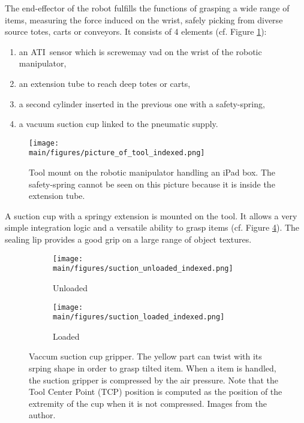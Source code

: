 \documentclass[/home/francois/latex/report/main.tex]{subfiles}
\begin{document}
The end-effector of the robot fulfills the functions of grasping a wide range of items, measuring the force induced on the wrist, safely picking from diverse source totes, carts or conveyors. It consists of 4 elements (cf. Figure \ref{fig:background:tool}):

\begin{enumerate}
  \item an ATI\texttrademark \ sensor which is screwemay vad on the wrist of the robotic manipulator,
  \item an extension tube to reach deep totes or carts,
  \item a second cylinder inserted in the previous one with a safety-spring,
  \item a vacuum suction cup linked to the pneumatic supply.
\end{enumerate}

\begin{figure}[h]
  \centering
  \texttt{[image: \\main/figures/picture\_of\_tool\_indexed.png]}
  \caption{Tool mount on the robotic manipulator handling an iPad box. The safety-spring cannot be seen on this picture because it is inside the extension tube.}
  \label{fig:background:tool}
\end{figure}

A suction cup with a springy extension is mounted on the tool. It allows a very simple integration logic and a versatile ability to grasp items (cf. Figure \ref{fig:background:suction}). The sealing lip provides a good grip on a large range of object textures.

\begin{figure}[h]
\centering
\begin{subfigure}{0.49\textwidth}
\centering
\texttt{[image: \\main/figures/suction\_unloaded\_indexed.png]}
\caption{Unloaded}
\label{fig:background:suction-unloaded}
\end{subfigure}
\begin{subfigure}{0.49\textwidth}
\centering
\texttt{[image: \\main/figures/suction\_loaded\_indexed.png]}
\caption{Loaded}
\label{fig:background:suction-loaded}
\end{subfigure}
\caption{Vaccum suction cup gripper. The yellow part can twist with its srping shape in order to grasp tilted item. When a item is handled, the suction gripper is compressed by the air pressure. Note that the Tool Center Point (TCP) position is computed as the position of the extremity of the cup when it is not compressed. Images from the author.}
\label{fig:background:suction}
\end{figure}
\end{document}
